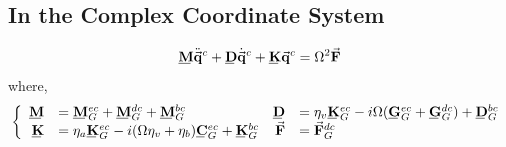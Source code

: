 \subsection{In the Complex Coordinate System}
\begin{equation}\label{eq:GlobalSystemofEquationsComplex}
\bunderline{\mathbf{M}}\ddot{\vec{\mathbf{q}}}^c+\bunderline{\mathbf{D}}\dot{\vec{\mathbf{q}}}^c+\bunderline{\mathbf{K}}\vec{\mathbf{q}}^c=\Omega^2\vec{\mathbf{F}}
\end{equation}
where,
\begin{equation*}
\left\{\begin{array}{rlrl}
\bunderline{\mathbf{M}}&=\bunderline{\mathbf{M}}^{ec}_G+\bunderline{\mathbf{M}}^{dc}_G+\bunderline{\mathbf{M}}^{bc}_G&\bunderline{\mathbf{D}}&=\eta_v\bunderline{\mathbf{K}}^{ec}_G-i\Omega(\bunderline{\mathbf{G}}^{ec}_G+\bunderline{\mathbf{G}}^{dc}_G)+\bunderline{\mathbf{D}}^{bc}_G\\
\bunderline{\mathbf{K}}&=\eta_a\bunderline{\mathbf{K}}^{ec}_G-i(\Omega\eta_v+\eta_b)\bunderline{\mathbf{C}}^{ec}_G+\bunderline{\mathbf{K}}^{bc}_G&\vec{\mathbf{F}}&=\vect{F}^{dc}_G
\end{array}\right.
\end{equation*}

